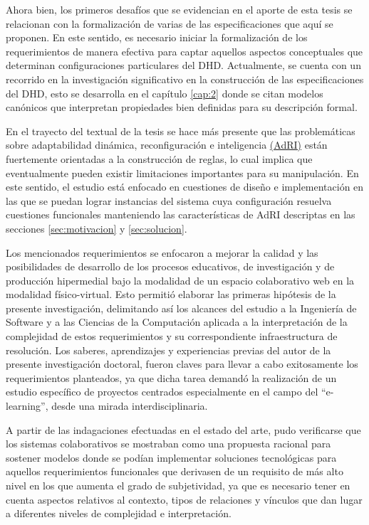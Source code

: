 Ahora bien, los primeros  desafíos  que se evidencian en el aporte de esta tesis se relacionan con la formalización de varias de las especificaciones que aquí se proponen. En este sentido, es necesario iniciar la formalización de los requerimientos de manera efectiva para captar aquellos aspectos conceptuales que determinan configuraciones particulares del DHD. Actualmente, se cuenta con un recorrido en la investigación significativo en la construcción de las especificaciones del DHD, esto se desarrolla en el capítulo \ref{cap:2} donde se citan modelos canónicos que interpretan propiedades bien definidas para su descripción formal.

En el trayecto del textual de la tesis se hace más presente que las problemáticas sobre adaptabilidad dinámica, reconfiguración e inteligencia \hyperref[AdRI]{(AdRI)} están fuertemente orientadas a la construcción de reglas, lo cual implica que eventualmente pueden existir limitaciones importantes para su manipulación. En este sentido, el estudio está enfocado en cuestiones de diseño e implementación en las que se puedan lograr instancias del sistema cuya configuración resuelva cuestiones funcionales manteniendo las
características de AdRI descriptas en las secciones \ref{sec:motivacion} y \ref{sec:solucion}.

Los mencionados requerimientos se enfocaron a mejorar la calidad y las posibilidades de desarrollo de los procesos educativos, de investigación y de producción hipermedial bajo la modalidad de un espacio colaborativo web en la modalidad físico-virtual. Esto permitió elaborar las primeras hipótesis de la presente investigación, delimitando así los alcances del estudio a la Ingeniería de Software y a las Ciencias de la Computación aplicada a la interpretación de la complejidad de estos requerimientos y su correspondiente infraestructura de resolución. Los saberes, aprendizajes y experiencias previas del autor de la presente investigación doctoral, fueron claves para llevar a cabo exitosamente los requerimientos planteados, ya que dicha tarea demandó la realización de un estudio específico de proyectos centrados especialmente en el campo del “e-learning'', desde una mirada interdisciplinaria. 

A partir de las indagaciones efectuadas en el estado del arte, pudo verificarse que los sistemas colaborativos se mostraban como una propuesta racional para sostener modelos donde se podían implementar soluciones tecnológicas para aquellos requerimientos funcionales que derivasen de un requisito de más alto nivel en los que aumenta el grado de subjetividad, ya que es necesario tener en cuenta aspectos relativos al contexto, tipos de relaciones y vínculos que dan lugar a diferentes niveles de complejidad e interpretación.
 
